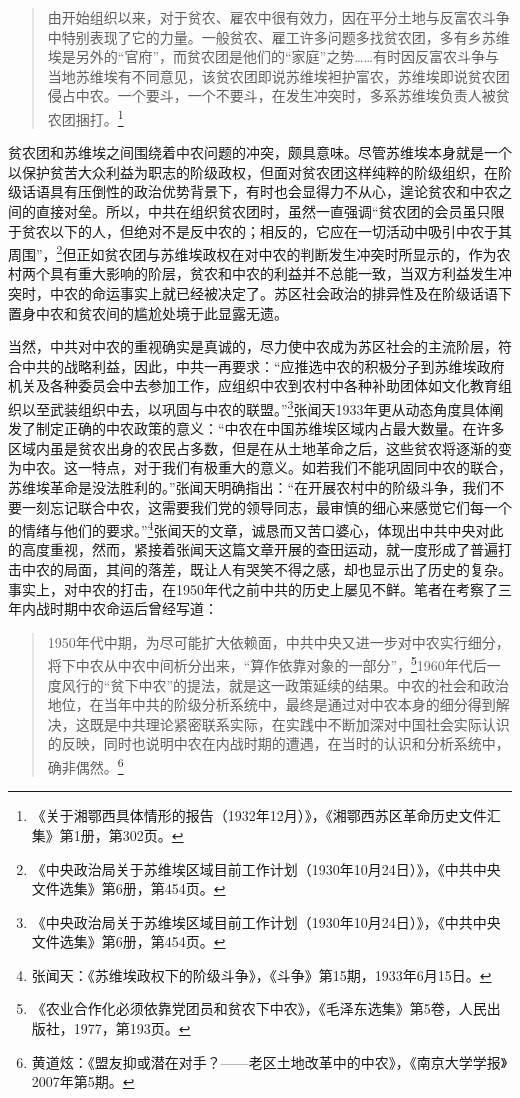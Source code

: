 \begin{quote}

由开始组织以来，对于贫农、雇农中很有效力，因在平分土地与反富农斗争中特别表现了它的力量。一般贫农、雇工许多问题多找贫农团，多有乡苏维埃是另外的“官府”，而贫农团是他们的“家庭”之势……有时因反富农斗争与当地苏维埃有不同意见，该贫农团即说苏维埃袒护富农，苏维埃即说贫农团侵占中农。一个要斗，一个不要斗，在发生冲突时，多系苏维埃负责人被贫农团捆打。\footnote{《关于湘鄂西具体情形的报告（1932年12月）》，《湘鄂西苏区革命历史文件汇集》第1册，第302页。}
\end{quote}


贫农团和苏维埃之间围绕着中农问题的冲突，颇具意味。尽管苏维埃本身就是一个以保护贫苦大众利益为职志的阶级政权，但面对贫农团这样纯粹的阶级组织，在阶级话语具有压倒性的政治优势背景下，有时也会显得力不从心，遑论贫农和中农之间的直接对垒。所以，中共在组织贫农团时，虽然一直强调“贫农团的会员虽只限于贫农以下的人，但绝对不是反中农的；相反的，它应在一切活动中吸引中农于其周围”，\footnote{《中央政治局关于苏维埃区域目前工作计划（1930年10月24日）》，《中共中央文件选集》第6册，第454页。}但正如贫农团与苏维埃政权在对中农的判断发生冲突时所显示的，作为农村两个具有重大影响的阶层，贫农和中农的利益并不总能一致，当双方利益发生冲突时，中农的命运事实上就已经被决定了。苏区社会政治的排异性及在阶级话语下置身中农和贫农间的尴尬处境于此显露无遗。


当然，中共对中农的重视确实是真诚的，尽力使中农成为苏区社会的主流阶层，符合中共的战略利益，因此，中共一再要求：“应推选中农的积极分子到苏维埃政府机关及各种委员会中去参加工作，应组织中农到农村中各种补助团体如文化教育组织以至武装组织中去，以巩固与中农的联盟。”\footnote{《中央政治局关于苏维埃区域目前工作计划（1930年10月24日）》，《中共中央文件选集》第6册，第454页。}张闻天1933年更从动态角度具体阐发了制定正确的中农政策的意义：“中农在中国苏维埃区域内占最大数量。在许多区域内虽是贫农出身的农民占多数，但是在从土地革命之后，这些贫农将逐渐的变为中农。这一特点，对于我们有极重大的意义。如若我们不能巩固同中农的联合，苏维埃革命是没法胜利的。”张闻天明确指出：“在开展农村中的阶级斗争，我们不要一刻忘记联合中农，这需要我们党的领导同志，最审慎的细心来感觉它们每一个的情绪与他们的要求。”\footnote{张闻天：《苏维埃政权下的阶级斗争》，《斗争》第15期，1933年6月15日。}张闻天的文章，诚恳而又苦口婆心，体现出中共中央对此的高度重视，然而，紧接着张闻天这篇文章开展的查田运动，就一度形成了普遍打击中农的局面，其间的落差，既让人有哭笑不得之感，却也显示出了历史的复杂。事实上，对中农的打击，在1950年代之前中共的历史上屡见不鲜。笔者在考察了三年内战时期中农命运后曾经写道：

\begin{quote}

1950年代中期，为尽可能扩大依赖面，中共中央又进一步对中农实行细分，将下中农从中农中间析分出来，“算作依靠对象的一部分”，\footnote{《农业合作化必须依靠党团员和贫农下中农》，《毛泽东选集》第5卷，人民出版社，1977，第193页。}1960年代后一度风行的“贫下中农”的提法，就是这一政策延续的结果。中农的社会和政治地位，在当年中共的阶级分析系统中，最终是通过对中农本身的细分得到解决，这既是中共理论紧密联系实际，在实践中不断加深对中国社会实际认识的反映，同时也说明中农在内战时期的遭遇，在当时的认识和分析系统中，确非偶然。\footnote{黄道炫：《盟友抑或潜在对手？——老区土地改革中的中农》，《南京大学学报》2007年第5期。}
\end{quote}


